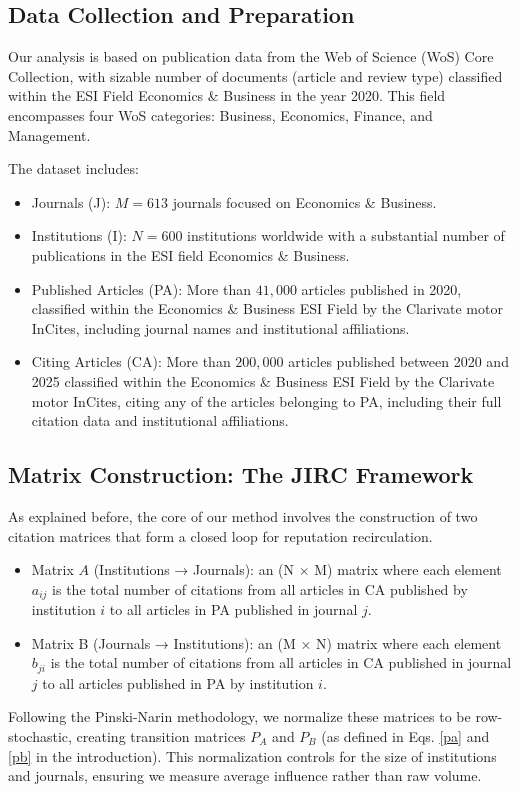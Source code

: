 \documentclass[10pt]{article}
\begin{document}
\subsection{Data Collection and Preparation}
Our analysis is based on publication data from the Web of Science (WoS) Core Collection,  with sizable number of documents  (article and review type) classified within the ESI Field Economics \& Business in the year 2020. This field encompasses four WoS categories: Business, Economics, Finance, and Management.

The dataset includes:
\begin{itemize}
\item Journals (J): $M =613$ journals focused on Economics \& Business.
\item Institutions (I): $N =600$ institutions worldwide with a substantial number of publications in the ESI field Economics \& Business.
\item Published Articles (PA): More than $41,000$ articles published in 2020, classified within the Economics \& Business ESI Field by the Clarivate motor InCites, including journal names and institutional affiliations.
\item Citing Articles (CA): More than $200,000$ articles published between 2020 and 2025  classified within the Economics \& Business ESI Field by the Clarivate motor InCites, citing any of the  articles belonging to PA, including their full citation data and institutional affiliations.
    \end{itemize}
\subsection{Matrix Construction: The JIRC Framework}
As explained before, the core of our method involves the construction of two citation matrices that form a closed loop for reputation recirculation.

\begin{itemize}
\item Matrix $A$ (Institutions → Journals): an (N × M) matrix where each element $a_{ij}$ is the total number of citations from all articles in CA published by institution $i$ to all articles in PA published in journal $j$.
\item Matrix B (Journals → Institutions): an (M × N) matrix where each element \(b_{ji}\) is the total number of citations from all articles in CA published in journal $j$ to all articles published in PA by institution $i$.
    \end{itemize}
Following the Pinski-Narin methodology, we normalize these matrices to be row-stochastic, creating transition matrices \(P_A\) and \(P_B\) (as defined in Eqs. \ref{pa}  and \ref{pb} in the introduction). This normalization controls for the size of institutions and journals, ensuring we measure average influence rather than raw volume.
\end{document}
